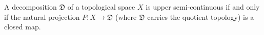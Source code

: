 A decomposition $\mathfrak{D}$ of a topological space $X$ is upper semi-continuous if and only if the natural projection $P: X \to \mathfrak{D}$ (where $\mathfrak{D}$ carries the quotient topology) is a closed map.
